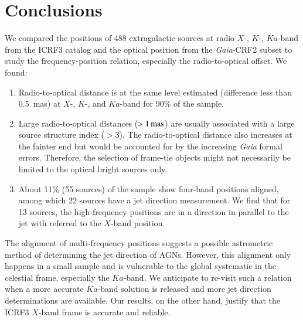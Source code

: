\documentclass[referee]{aa}        %
\begin{document}

\section{Conclusions} \label{sec:conclusions}

   We compared the positions of 488 extragalactic sources at radio $X$-, $K$-, $Ka$-band from the ICRF3 catalog and the optical position from the \textit{Gaia}-CRF2 subset to study the frequency-position relation, especially the radio-to-optical offset.
   We found:
   \begin{enumerate}
   \item Radio-to-optical distance is at the same level estimated (difference less than 0.5~mas) at $X$-, $K$-, and $Ka$-band for 90\% of the sample.
   \item Large radio-to-optical distances ($>1\,{\rm mas}$) are usually associated with a large source structure index ($>3$).
   The radio-to-optical distance also increases at the fainter end but would be accounted for by the increasing \textit{Gaia} formal errors.
   Therefore, the selection of frame-tie objects might not necessarily be limited to the optical bright sources only.
   \item About 11\% (55 sources) of the sample show four-band positions aligned, among which 22 sources have a jet direction measurement.
   We find that for 13 sources, the high-frequency positions are in a direction in parallel to the jet with referred to the $X$-band position.
   \end{enumerate}

   The alignment of multi-frequency positions suggests a possible astrometric method of determining the jet direction of AGNs.
   However, this alignment only happens in a small sample and is vulnerable to the global systematic in the celestial frame, especially the $Ka$-band.
   We anticipate to re-visit such a relation when a more accurate $Ka$-band solution is released and more jet direction determinations are available.
   Our results, on the other hand, justify that the ICRF3 $X$-band frame is accurate and reliable.

\end{document}

